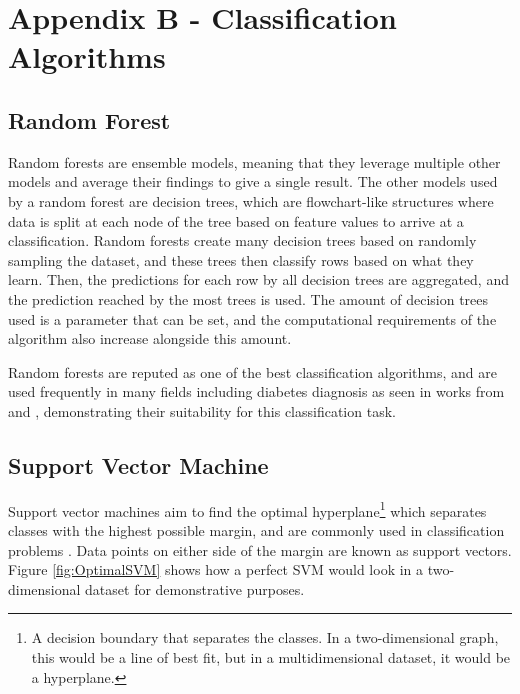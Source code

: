 \begingroup
\renewcommand\thechapter{B}
\titleformat{\chapter}[display]
{\normalfont\huge\bfseries}{}{20pt}{\Huge}
\setcounter{section}{0} %

\chapter*{Appendix B - Classification Algorithms}

\section{Random Forest}
Random forests are ensemble models, meaning that they leverage multiple other models and average their findings to 
give a single result. The other models used by a random forest are decision trees, which are flowchart-like structures where 
data is split at each node of the tree based on feature values to arrive at a classification. Random forests create many decision 
trees based on randomly sampling the dataset, and these trees then classify rows based on what they learn. Then, the predictions 
for each row by all decision trees are aggregated, and the prediction reached by the most trees is used.
The amount of decision trees used is a parameter that can be set, and the computational requirements of the algorithm 
also increase alongside this amount.

\para Random forests are reputed as one of the best classification algorithms, and are used frequently in many fields 
including diabetes diagnosis as seen in works from \textcite{chang_pima_2023} and \textcite{alzubi_diabetes_2023},
demonstrating their suitability for this classification task.

\section{Support Vector Machine}
Support vector machines aim to find the optimal hyperplane\footnote{A decision boundary that separates the classes. In a two-dimensional graph, this would be a line of best fit, but in a multidimensional dataset, it would be a hyperplane.}
which separates classes with the highest possible margin, and are commonly used in classification problems \autocite{ibm_what_2023}. Data points on either 
side of the margin are known as support vectors. Figure \ref{fig:OptimalSVM} shows how a perfect SVM would look in a two-dimensional dataset for demonstrative purposes.

